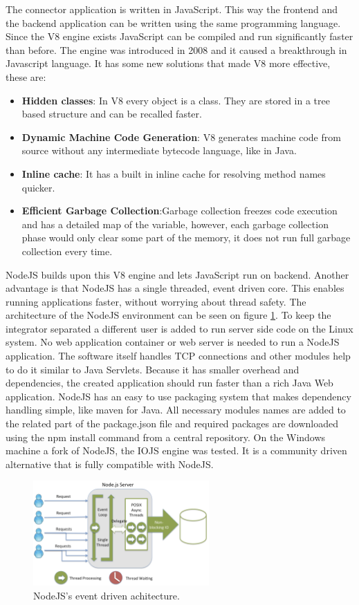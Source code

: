 The connector application is written in JavaScript. This way the frontend and the backend application can be written using the same programming language. 
Since the V8 engine exists JavaScript can be compiled and run significantly faster\cite{v8} than before. 
The engine was introduced in 2008 and it caused a breakthrough in Javascript language. It has some new solutions that made V8 more effective, these are:
\begin{itemize}
\item \textbf{Hidden classes}: In V8 every object is a class. They are stored in a tree based structure and can be recalled faster.
\item \textbf{Dynamic Machine Code Generation}: V8 generates machine code from source without any intermediate bytecode language, like in Java.
\item \textbf{Inline cache}: It has a built in inline cache for resolving method names quicker.
\item \textbf{Efficient Garbage Collection}:Garbage collection freezes code execution and has a detailed map of the variable, however, each garbage collection phase would only clear some part of the memory, it does not run full garbage collection every time.
\end{itemize}
NodeJS builds upon this V8 engine and lets JavaScript run on backend. Another advantage is that NodeJS has a single threaded, event driven core. This enables running applications faster, without worrying about thread safety. The architecture of the NodeJS environment can be seen on figure \ref{fig:node}. 
To keep the integrator separated a different user is added to run server side code on the Linux system. 
No web application container or web server is needed to run a NodeJS application. 
The software itself handles TCP connections and other modules help to do it similar to Java Servlets. 
Because it has smaller overhead and dependencies, the created application should run faster than a rich Java Web application. 
NodeJS has an easy to use packaging system that makes dependency handling simple, like maven for Java. All necessary modules names are added to the related part of the package.json file and required packages are downloaded using the npm install command from a central repository. On the Windows machine a fork of NodeJS, the IOJS engine was tested. It is a community driven alternative that is fully compatible with NodeJS.
 
\begin{figure}[h]
\centering
\includegraphics[width=0.6\textwidth]{figures/node.png}
\caption{NodeJS's event driven achitecture.\label{fig:node}}
\end{figure}

